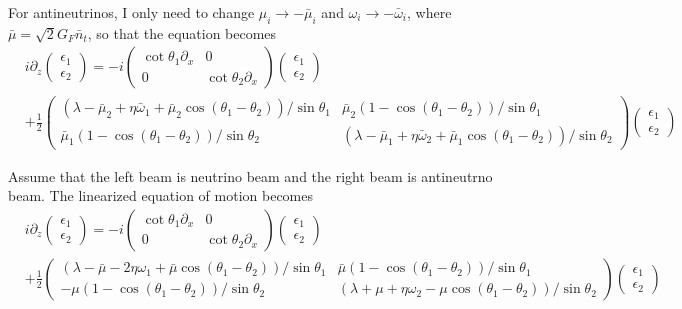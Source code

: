 For antineutrinos, I only need to change $\mu_i\to -\bar\mu_i$ and $\omega_i\to -\bar\omega_i$, where $\bar\mu=\sqrt{2}G_F \bar n_t$, so that the equation becomes
\small\begin{align*}
  &i \partial_z \begin{pmatrix}
  \epsilon_1 \\
  \epsilon_2
  \end{pmatrix} =  - i \begin{pmatrix}\cot\theta_1\partial_x & 0 \\
  0 & \cot\theta_2 \partial_x
  \end{pmatrix} \begin{pmatrix}
  \epsilon_1 \\
  \epsilon_2
  \end{pmatrix} \\
  &+
  \frac{1}{2}\begin{pmatrix}
  (\lambda-\bar\mu_2 + \eta \bar\omega_1 + \bar\mu_2 \cos(\theta_1-\theta_2) )/\sin \theta_1 & \bar\mu_2 (1-\cos(\theta_1-\theta_2)) /\sin \theta_1 \\
  \bar\mu_1 (1- \cos(\theta_1-\theta_2))/\sin\theta_2 & (\lambda -\bar\mu_1 + \eta \bar\omega_2 +\bar\mu_1 \cos(\theta_1-\theta_2) )/\sin\theta_2
  \end{pmatrix}\begin{pmatrix}
  \epsilon_1 \\
  \epsilon_2
  \end{pmatrix}
\end{align*}\normalsize

Assume that the left beam is neutrino beam and the right beam is antineutrno beam. The linearized equation of motion becomes
\small
\begin{align*}
  &i\partial_z \begin{pmatrix}
  \epsilon_1 \\
  \epsilon_2
  \end{pmatrix} =  -i\begin{pmatrix}
  \cot\theta_1 \partial_x & 0 \\
  0 & \cot\theta_2 \partial_x
  \end{pmatrix}\begin{pmatrix}
  \epsilon_1 \\
  \epsilon_2
  \end{pmatrix} \\
  &+ \frac{1}{2}\begin{pmatrix}
  (\lambda - \bar\mu - 2\eta \omega_1 + \bar\mu \cos(\theta_1-\theta_2) )/\sin\theta_1 & \bar\mu (1-\cos(\theta_1-\theta_2))/\sin\theta_1 \\
  -\mu(1-\cos(\theta_1-\theta_2))/\sin\theta_2 & (\lambda + \mu + \eta \omega_2 - \mu \cos(\theta_1-\theta_2) )/\sin\theta_2
  \end{pmatrix}\begin{pmatrix}
  \epsilon_1 \\
  \epsilon_2
  \end{pmatrix}
\end{align*}
\normalsize


